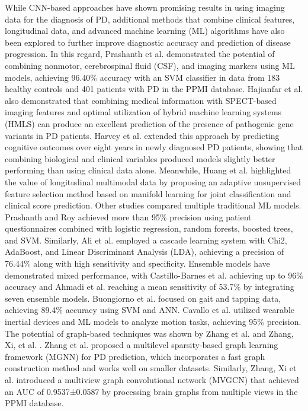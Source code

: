 \documentclass[twocolumn]{article}
\begin{document}
While CNN-based approaches have shown promising results in using imaging data for the diagnosis of PD, additional methods that combine clinical features, longitudinal data, and advanced machine learning (ML) algorithms have also been explored to further improve diagnostic accuracy and prediction of disease progression. In this regard, Prashanth et al. \cite{DBLP:journals/ijmi/PrashanthRMG16} demonstrated the potential of combining nonmotor, cerebrospinal fluid (CSF), and imaging markers using ML models, achieving 96.40\% accuracy with an SVM classifier in data from 183 healthy controls and 401 patients with PD in the PPMI database. Hajianfar et al. \cite{hajianfar2023prediction} also demonstrated that combining medical information with SPECT-based imaging features and optimal utilization of hybrid machine learning systems (HMLS) can produce an excellent prediction of the presence of pathogenic gene variants in PD patients. Harvey et al. \cite{harvey2022machine} extended this approach by predicting cognitive outcomes over eight years in newly diagnosed PD patients, showing that combining biological and clinical variables produced models slightly better performing than using clinical data alone. Meanwhile, Huang et al. \cite{DBLP:journals/tnn/HuangLCFXEQL22} highlighted the value of longitudinal multimodal data by proposing an adaptive unsupervised feature selection method based on manifold learning for joint classification and clinical score prediction. Other studies compared multiple traditional ML models. Prashanth and Roy \cite{prashanth2018early} achieved more than 95\% precision using patient questionnaires combined with logistic regression, random forests, boosted trees, and SVM. Similarly, Ali et al. \cite{ali2019reliable} employed a cascade learning system with Chi2, AdaBoost, and Linear Discriminant Analysis (LDA), achieving a precision of 76.44\% along with high sensitivity and specificity. Ensemble models have demonstrated mixed performance, with Castillo-Barnes et al. \cite{castillo2018robust} achieving up to 96\% accuracy and Ahmadi et al. \cite{ahmadi2019towards} reaching a mean sensitivity of 53.7\% by integrating seven ensemble models. Buongiorno et al. \cite{buongiorno2019low} focused on gait and tapping data, achieving 89.4\% accuracy using SVM and ANN. Cavallo et al. \cite{cavallo2019upper} utilized wearable inertial devices and ML models to analyze motion tasks, achieving 95\% precision. The potential of graph-based techniques was shown by Zhang et al. \cite{zhang2023multi} and Zhang, Xi, et al. \cite{DBLP:conf/amia/Zhang00LZW18}. Zhang et al. \cite{zhang2023multi} proposed a multilevel sparsity-based graph learning framework (MGNN) for PD prediction, which incorporates a fast graph construction method and works well on smaller datasets. Similarly, Zhang, Xi et al. \cite{DBLP:conf/amia/Zhang00LZW18} introduced a multiview graph convolutional network (MVGCN) that achieved an AUC of 0.9537±0.0587 by processing brain graphs from multiple views in the PPMI database. 
\end{document}
